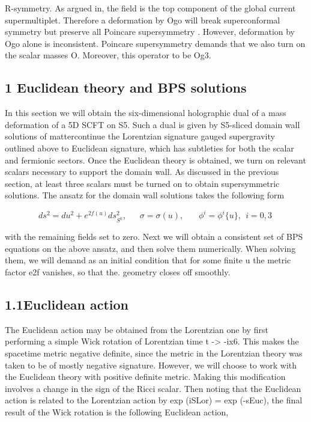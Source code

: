 \documentclass{article}
\begin{document}
\sloppy

R-symmetry. As argued in, the field  is the top component of the global current
supermultiplet. Therefore a deformation by Ogo will break superconformal symmetry but
preserve all Poincare supersymmetry . However, deformation by Ogo alone is inconsistent.
Poincare supersymmetry demands that we also turn on the scalar masses O. Moreover,
this operator to be Og3.


\subsection*{1 Euclidean theory and BPS solutions}


In this section we will obtain the six-dimensional holographic dual of a mass deformation
of a 5D SCFT on S5. Such a dual is given by S5-sliced domain wall solutions of mattercontinue the Lorentzian signature gauged supergravity outlined above to Euclidean signature,
which has subtleties for both the scalar and fermionic sectors. Once the Euclidean theory
is obtained, we turn on relevant scalars necessary to support the domain wall. As discussed
in the previous section, at least three scalars must be turned on to obtain supersymmetric
solutions. The ansatz for the domain wall solutions takes the following form


\begin{equation}
d s ^ { 2 } = d u ^ { 2 } + e ^ { 2 f ( u ) } d s _ { S ^ { k } } ^ { 2 }, ~ ~ ~ ~ ~ ~ ~ \sigma = \sigma ( u ), ~ ~ ~ ~ ~ ~ ~ ~ \phi ^ { i } = \phi ^ { i } \{ u \}, ~ ~ i = 0, 3 ~
\end{equation}


with the remaining fields set to zero. Next we will obtain a consistent set of BPS equations
on the above ansatz, and then solve them numerically. When solving them, we will demand
as an initial condition that for some finite u the metric factor e2f vanishes, so that the.
geometry closes off smoothly.


\subsection*{1.1Euclidean action}


The Euclidean action may be obtained from the Lorentzian one by first performing a simple
Wick rotation of Lorentzian time t -> -ix6. This makes the spacetime metric negative definite, since the metric in the Lorentzian theory was taken to be of mostly negative signature.
However, we will choose to work with the Euclidean theory with positive definite metric.
Making this modification involves a change in the sign of the Ricci scalar. Then noting that
the Euclidean action is related to the Lorentzian action by exp (iSLor) = exp (-sEuc), the
final result of the Wick rotation is the following Euclidean action,
\end{document}
